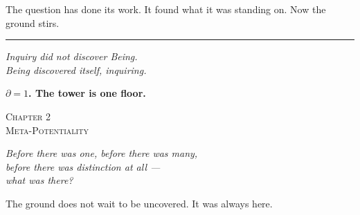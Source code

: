\documentclass[10pt, openany, oneside]{book}
\renewcommand{\large}{\fontsize{11.5}{14}\selectfont}
\renewcommand{\huge}{\fontsize{17}{21}\selectfont}
\begin{document}
The question has done its work. It found what it was standing on. Now the ground stirs.

\vspace{2em}

\begin{center}
    \rule{0.15\textwidth}{0.3pt}
\end{center}

\vspace{0.5em}

\begin{center}
    \itshape
    Inquiry did not discover Being.\\
    Being discovered itself, inquiring.
\end{center}

\vspace{0.5em}

\begin{center}
    \textbf{$\partial = 1$. The tower is one floor.}
\end{center}


%
%
%

\newpage

\begin{center}
    {\huge\scshape Chapter 2}\\[0.3em]
    {\large\scshape Meta-Potentiality}
\end{center}

\vspace{1.5em}

\begin{center}
    \itshape
    Before there was one, before there was many,\\
    before there was distinction at all ---\\
    what was there?
\end{center}

\vspace{2em}


\noindent The ground does not wait to be uncovered. It was always here.
\end{document}
